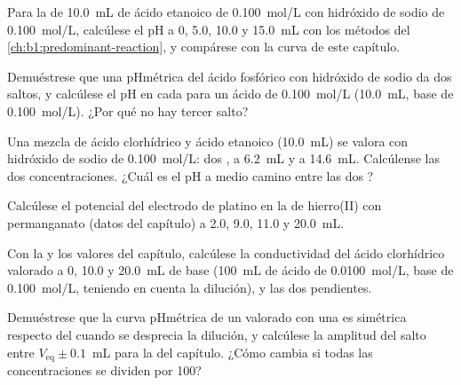 \begin{exercise}[$\star\star$]\label{exo:b1:titration-methods:5}
Para la  de \qty{10.0}{mL} de ácido etanoico de
\qty{0.100}{mol/L} con hidróxido de sodio de \qty{0.100}{mol/L},
calcúlese el pH a 0, 5.0, 10.0 y \qty{15.0}{mL} con los métodos del
\cref{ch:b1:predominant-reaction}, y compárese con la curva de este
capítulo.
\end{exercise}

\begin{exercise}[$\star\star$]\label{exo:b1:titration-methods:6}
Demuéstrese que una  pHmétrica del ácido fosfórico con
hidróxido de sodio da dos saltos, y calcúlese el pH en cada 
para un ácido de \qty{0.100}{mol/L} (\qty{10.0}{mL}, base de
\qty{0.100}{mol/L}). ¿Por qué no hay tercer salto?
\end{exercise}

\begin{exercise}[$\star\star$]\label{exo:b1:titration-methods:7}
Una mezcla de ácido clorhídrico y ácido etanoico (\qty{10.0}{mL}) se
valora con hidróxido de sodio de \qty{0.100}{mol/L}: dos , a
\qty{6.2}{mL} y a \qty{14.6}{mL}. Calcúlense las dos concentraciones.
¿Cuál es el pH a medio camino entre las dos ?
\end{exercise}

\begin{exercise}[$\star\star$]\label{exo:b1:titration-methods:8}
Calcúlese el potencial del electrodo de platino en la  de
hierro(II) con permanganato (datos del capítulo) a 2.0, 9.0, 11.0 y
\qty{20.0}{mL}.
\end{exercise}

\begin{exercise}[$\star\star$]\label{exo:b1:titration-methods:9}
Con la  y los valores del capítulo, calcúlese la
conductividad del ácido clorhídrico valorado a 0, 10.0 y \qty{20.0}{mL}
de base (\qty{100}{mL} de ácido de \qty{0.0100}{mol/L}, base de
\qty{0.100}{mol/L}, teniendo en cuenta la dilución), y las dos pendientes.
\end{exercise}

\begin{exercise}[$\star\star\star$]\label{exo:b1:titration-methods:10}
Demuéstrese que la curva pHmétrica de un  valorado con una
 es simétrica respecto del  cuando se
desprecia la dilución, y calcúlese la amplitud del salto entre
$V_{\mathrm{eq}} \pm 0.1$~mL para la  del capítulo. ¿Cómo
cambia si todas las concentraciones se dividen por 100?
\end{exercise}

